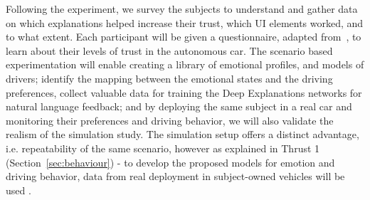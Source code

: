 Following the experiment, we survey the subjects to understand and gather data on which explanations helped increase their trust, which UI elements worked, and to what extent.
Each participant will be given a questionnaire, adapted from~\cite{merritt2013trust}, to learn about their levels of trust in the autonomous car. 
\newline
{} The scenario based experimentation will enable creating a library of emotional profiles, and models of drivers; identify the mapping between the emotional states and the driving preferences, collect valuable data for training the Deep Explanations networks for natural language feedback; and by deploying the same subject in a real car and monitoring their preferences and driving behavior, we will also validate the realism of the simulation study. 
The simulation setup offers a distinct advantage, i.e. repeatability of the same scenario, however as explained in Thrust 1 (Section~\ref{sec:behaviour}) - to develop the proposed models for emotion and driving behavior, data from real deployment in subject-owned vehicles will be used . 


